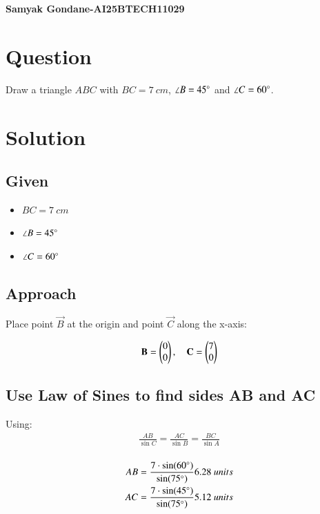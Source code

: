 \documentclass{article}
\begin{document}
\begin{center}
\large
    \textbf{Samyak Gondane-AI25BTECH11029}
\end{center}
\date{}

\section*{Question}
Draw a triangle $ABC$ with $BC = 7\ cm$, $\angle B = 45\degree$ and $\angle C = 60\degree$.

\section*{Solution}

\subsection*{Given}
\begin{itemize}
    \item $BC = 7\ cm$
    \item $\angle B = 45\degree$
    \item $\angle C = 60\degree$
\end{itemize}

\subsection*{Approach}
Place point $\vec{B}$ at the origin and point $\vec{C}$ along the x-axis:


\begin{align}
\mathbf{B} = \begin{pmatrix}0 \\ 0\end{pmatrix}, \quad
\mathbf{C} = \begin{pmatrix}7 \\ 0\end{pmatrix}
\end{align}



\subsection*{Use Law of Sines to find sides AB and AC}

Using:
\begin{align}
    \frac{AB}{\sin C} = \frac{AC}{\sin B} = \frac{BC}{\sin A}\\
\end{align}

\begin{align}
    AB = \frac{7 \cdot \sin(60\degree)}{\sin(75\degree)}      6.28\ units\\
    AC = \frac{7 \cdot \sin(45\degree)}{\sin(75\degree)}      5.12\ units
\end{align}
\end{document}
